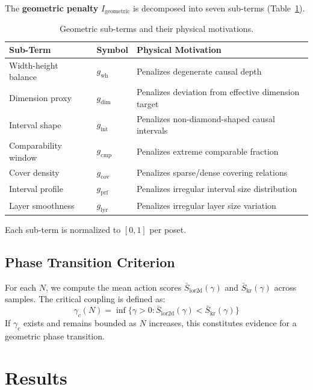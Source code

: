 \documentclass[entropy,article,submit,pdftex,moreauthors]{Definitions/mdpi}
\begin{document}
The \textbf{geometric penalty} $I_{\text{geometric}}$ is decomposed into seven sub-terms (Table~\ref{tab:subterms}).

\begin{table}[H]
\caption{Geometric sub-terms and their physical motivations.\label{tab:subterms}}
\begin{tabular}{lll}
\toprule
\textbf{Sub-Term} & \textbf{Symbol} & \textbf{Physical Motivation} \\
\midrule
Width-height balance & $g_{\text{wh}}$ & Penalizes degenerate causal depth \\
Dimension proxy & $g_{\text{dim}}$ & Penalizes deviation from effective dimension target \\
Interval shape & $g_{\text{int}}$ & Penalizes non-diamond-shaped causal intervals \\
Comparability window & $g_{\text{cmp}}$ & Penalizes extreme comparable fraction \\
Cover density & $g_{\text{cov}}$ & Penalizes sparse/dense covering relations \\
Interval profile & $g_{\text{prf}}$ & Penalizes irregular interval size distribution \\
Layer smoothness & $g_{\text{lyr}}$ & Penalizes irregular layer size variation \\
\bottomrule
\end{tabular}
\end{table}

Each sub-term is normalized to $[0, 1]$ per poset.

\subsection{Phase Transition Criterion}

For each $N$, we compute the mean action scores $\bar{S}_{\text{lor2d}}(\gamma)$ and $\bar{S}_{\text{kr}}(\gamma)$ across samples. The critical coupling is defined as:
\begin{equation}
    \gamma_c(N) = \inf\bigl\{\gamma > 0 : \bar{S}_{\text{lor2d}}(\gamma) < \bar{S}_{\text{kr}}(\gamma)\bigr\}
    \label{eq:gamma_c}
\end{equation}
If $\gamma_c$ exists and remains bounded as $N$ increases, this constitutes evidence for a geometric phase transition.

\section{Results}
\end{document}
